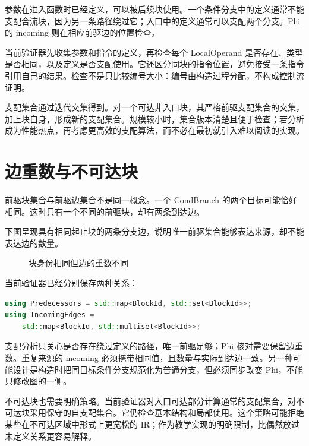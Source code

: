 参数在进入函数时已经定义，可以被后续块使用。一个条件分支中的定义通常不能支配合流块，因为另一条路径绕过它；入口中的定义通常可以支配两个分支。Phi 的 incoming 则在相应前驱边的位置检查。

当前验证器先收集参数和指令的定义，再检查每个 LocalOperand 是否存在、类型是否相同，以及定义是否支配使用。它还区分同块的指令位置，避免接受一条指令引用自己的结果。检查不是只比较编号大小：编号由构造过程分配，不构成控制流证明。

支配集合通过迭代交集得到。对一个可达非入口块，其严格前驱支配集合的交集，加上块自身，形成新的支配集合。规模较小时，集合版本清楚且便于检查；若分析成为性能热点，再考虑更高效的支配算法，而不必在最初就引入难以阅读的实现。

\section{边重数与不可达块}
前驱块集合与前驱边集合不是同一概念。一个 CondBranch 的两个目标可能恰好相同。这时只有一个不同的前驱块，却有两条到达边。

下图呈现具有相同起止块的两条分支边，说明唯一前驱集合能够表达来源，却不能表达边的数量。
\begin{figure}[htbp]\centering
{}
\caption{块身份相同但边的重数不同}
\end{figure}

当前验证器已经分别保存两种关系：
\begin{lstlisting}[language=C++,caption={当前前驱与到达边的不同表示}]
using Predecessors = std::map<BlockId, std::set<BlockId>>;
using IncomingEdges =
    std::map<BlockId, std::multiset<BlockId>>;
\end{lstlisting}
支配分析只关心是否存在绕过定义的路径，唯一前驱足够；Phi 核对需要保留边重数。重复来源的 incoming 必须携带相同值，且数量与实际到达边一致。另一种可能设计是构造时把同目标条件分支规范化为普通分支，但必须同步改变 Phi，不能只修改图的一侧。

不可达块也需要明确策略。当前验证器对入口可达部分计算通常的支配集合，对不可达块采用保守的自支配集合。它仍检查基本结构和局部使用。这个策略可能拒绝某些在不可达区域中形式上更宽松的 IR；作为教学实现的明确限制，比偶然放过未定义关系更容易解释。

